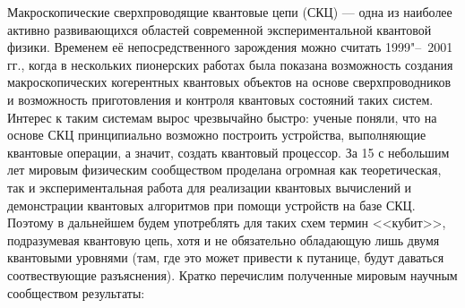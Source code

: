 {\actuality} 
Макроскопические сверхпроводящие квантовые цепи (СКЦ) --- одна из наиболее активно развивающихся областей современной экспериментальной квантовой физики. Временем её непосредственного зарождения можно считать  1999"--~2001 гг., когда в нескольких пионерских работах \cite{nakamura1999coherent,mooij1999josephson,makhlin1999josephson,orlando1999superconducting} была показана  возможность создания макроскопических когерентных квантовых объектов на основе сверхпроводников и возможность приготовления и контроля квантовых состояний таких систем. Интерес к таким системам вырос чрезвычайно быстро: ученые поняли, что на основе СКЦ принципиально возможно построить устройства, выполняющие квантовые операции, а значит, создать квантовый процессор. За 15 с небольшим лет мировым физическим сообществом проделана огромная как теоретическая, так и экспериментальная работа для реализации квантовых вычислений и демонстрации квантовых алгоритмов при помощи устройств на базе СКЦ. Поэтому в дальнейшем будем употреблять для таких схем термин <<кубит>>, подразумевая квантовую цепь, хотя и не обязательно обладающую лишь двумя квантовыми уровнями (там, где это может привести к путанице, будут даваться соотвествующие разъяснения).  Кратко перечислим полученные мировым научным сообществом результаты:
